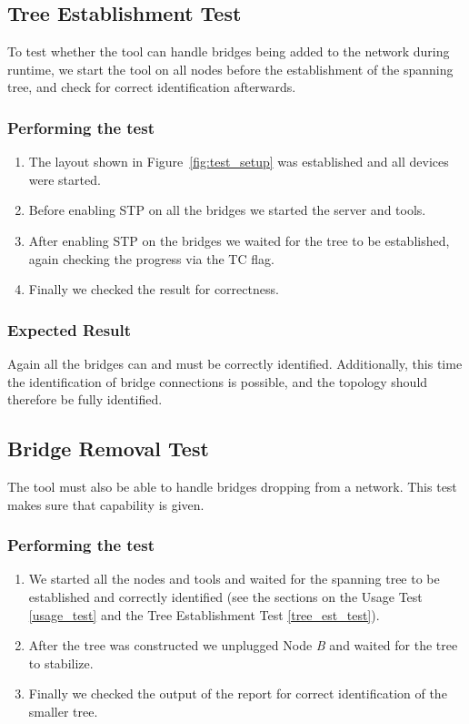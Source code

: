 \subsection*{Tree Establishment Test}
\label{tree_est_test}
To test whether the tool can handle bridges being added to the network during runtime, we start the tool on all nodes before the establishment of the spanning tree, and check for correct identification afterwards.

\subsubsection*{Performing the test}
\begin{enumerate}
    \item The layout shown in Figure~\ref{fig:test_setup} was established and all devices were started.
    \item Before enabling STP on all the bridges we started the server and tools.
    \item After enabling STP on the bridges we waited for the tree to be established, again checking the progress via the TC flag.
    \item Finally we checked the result for correctness.
\end{enumerate}

\subsubsection*{Expected Result}
Again all the bridges can and must be correctly identified.
Additionally, this time the identification of bridge connections is possible, and the topology should therefore be fully identified.

\subsection*{Bridge Removal Test}
\label{removal_test}
The tool must also be able to handle bridges dropping from a network.
This test makes sure that capability is given.

\subsubsection*{Performing the test}
\begin{enumerate}
    \item We started all the nodes and tools and waited for the spanning tree to be established and correctly identified (see the sections on the Usage Test \ref{usage_test} and the Tree Establishment Test \ref{tree_est_test}).
    \item After the tree was constructed we unplugged Node \textit{B} and waited for the tree to stabilize.
    \item Finally we checked the output of the report for correct identification of the smaller tree.
\end{enumerate}

